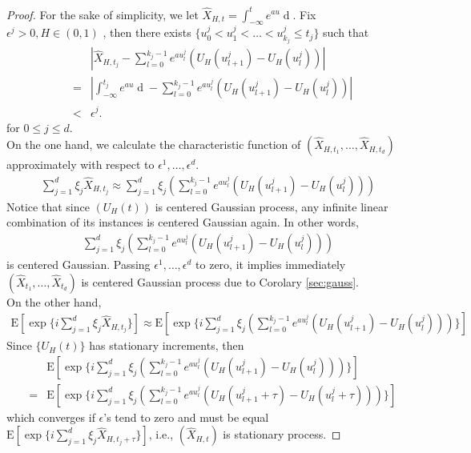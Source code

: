 \documentclass[a4paper, twoside, 11pt]{article}
\theoremstyle{definition}
\newcommand{\brkt}[1]{\left({#1} \right)}
\begin{document}
\begin{proof}
  For the sake of simplicity, we let $\hat{X}_{H,t} = \int_{-\infty}^t e^{au}\mathop{dU_H(u)}$.
  Fix $\epsilon^j > 0, H\in (0,1)$ , then there exists  $\{u_0^j<u_1^j<\dots<u^j_{k_j}\le t_j\}$ such that
  \begin{eqnarray*}
	&&|\hat{X}_{H,t_j} - \sum_{l=0}^{k_j-1} e^{au^j_l}(U_H(u^j_{l+1}) - U_H(u^j_{l}))|\\
	&=& |\int_{-\infty}^{t_j} e^{au}\mathop{dU_H(u)} - \sum_{l=0}^{k_j-1} e^{au^j_l}(U_H(u^j_{l+1}) - U_H(u^j_{l}))|\\
	&<& \epsilon^j.
  \end{eqnarray*}
  for $0 \le j \le d $.\\
  On the one hand, we calculate the characteristic function of $(\hat{X}_{H, t_1},\dots, \hat{X}_{H, t_d})$ approximately with respect to $\epsilon^1,\dots,\epsilon^d$.
  \begin{eqnarray*}
	\sum_{j=1}^d \xi_j\hat{X}_{H,t_j} \approx \sum_{j=1}^d \xi_j\brkt{\sum_{l=0}^{k_j-1} e^{au^j_l}(U_H(u^j_{l+1}) - U_H(u^j_{l}))}
  \end{eqnarray*}
  Notice that since $(U_H(t))$ is centered Gaussian process, any infinite linear combination of its instances is centered Gaussian again. In other words, 
  \begin{eqnarray*}
	\sum_{j=1}^d \xi_j \brkt{\sum_{l=0}^{k_j-1} e^{au^j_l}(U_H(u^j_{l+1}) - U_H(u^j_{l})) }
  \end{eqnarray*}
  is centered Gaussian. Passing $\epsilon^1,\dots,\epsilon^d$ to zero, it implies immediately $(\hat{X}_{t_1},\dots, \hat{X}_{t_d})$ is centered Gaussian process due to Corolary \ref{sec:gauss}.\\
  On the other hand,
	\begin{eqnarray*}
	\mathrm{E}[\exp\{i\sum_{j=1}^d \xi_j\hat{X}_{H, t_j}\}] \approx \mathrm{E}[\exp\{ i\sum_{j=1}^d \xi_j\brkt{\sum_{l=0}^{k_j-1} e^{au^j_l}(U_H(u^j_{l+1}) - U_H(u^j_{l})) }\}]
  \end{eqnarray*}
  Since $\{U_H(t)\}$ has stationary increments, then 
  \begin{eqnarray*}
	&& \mathrm{E}[\exp\{ i\sum_{j=1}^d \xi_j\brkt{\sum_{l=0}^{k_j-1} e^{au^j_l}(U_H(u^j_{l+1}) - U_H(u^j_{l})) }\}] \\
	&=& \mathrm{E}[\exp\{ i\sum_{j=1}^d \xi_j\brkt{\sum_{l=0}^{k_j-1} e^{au^j_l}(U_H(u^j_{l+1}+\tau) - U_H(u^j_{l}+\tau)) }\}]
  \end{eqnarray*}
  which converges if $\epsilon$'s tend to zero and must be equal $\mathrm{E}[\exp\{ i\sum_{j=1}^d \xi_j \hat{X}_{H, t_j+\tau}\}]$, i.e., $(\hat{X}_{H,t})$ is stationary process.
\end{proof}
\end{document}
